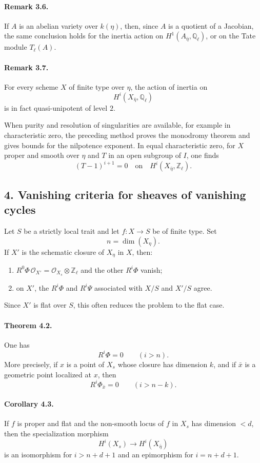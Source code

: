 \documentclass[12pt]{article}
\newcommand{\ZZ}{\mathbb Z}
\newcommand{\QQ}{\mathbb Q}
\newcommand{\cO}{\mathcal O}
\newcommand{\longto}{\longrightarrow}
\begin{document}
\paragraph{Remark 3.6.}
If $A$ is an abelian variety over $k(\eta)$, then, since $A$ is a quotient of a Jacobian, the same conclusion holds for the inertia action on $H^1(A_{\bar\eta},\QQ_\ell)$, or on the Tate module $T_\ell(A)$.

\paragraph{Remark 3.7.}
For every scheme $X$ of finite type over $\eta$, the action of inertia on
\[
H^i(X_{\bar\eta},\QQ_\ell)
\]
is in fact quasi-unipotent of level $2$.

When purity and resolution of singularities are available, for example in characteristic zero, the preceding method proves the monodromy theorem and gives bounds for the nilpotence exponent. In equal characteristic zero, for $X$ proper and smooth over $\eta$ and $T$ in an open subgroup of $I$, one finds
\[
(T-1)^{i+1}=0
\quad\text{on}\quad
H^i(X_{\bar\eta},\ZZ_\ell).
\]

\subsection*{4. Vanishing criteria for sheaves of vanishing cycles}

Let $S$ be a strictly local trait and let $f:X\to S$ be of finite type. Set
\[
n=\dim(X_\eta).
\]
If $X'$ is the schematic closure of $X_\eta$ in $X$, then:
\begin{enumerate}[label=\alph*)]
\item $R^0\Phi\,\cO_{X'}=\cO_{X_s}\otimes\ZZ_\ell$ and the other $R^i\Phi$ vanish;
\item on $X'$, the $R^i\Phi$ and $R^i\Psi$ associated with $X/S$ and $X'/S$ agree.
\end{enumerate}
Since $X'$ is flat over $S$, this often reduces the problem to the flat case.

\paragraph{Theorem 4.2.}
One has
\[
R^i\Phi=0\qquad (i>n).
\]
More precisely, if $x$ is a point of $X_s$ whose closure has dimension $k$, and if $\bar x$ is a geometric point localized at $x$, then
\[
R^i\Phi_{\bar x}=0\qquad (i>n-k).
\]

\paragraph{Corollary 4.3.}
If $f$ is proper and flat and the non-smooth locus of $f$ in $X_s$ has dimension $<d$, then the specialization morphism
\[
H^i(X_s)\longto H^i(X_{\bar\eta})
\]
is an isomorphism for $i>n+d+1$ and an epimorphism for $i=n+d+1$.
\end{document}
